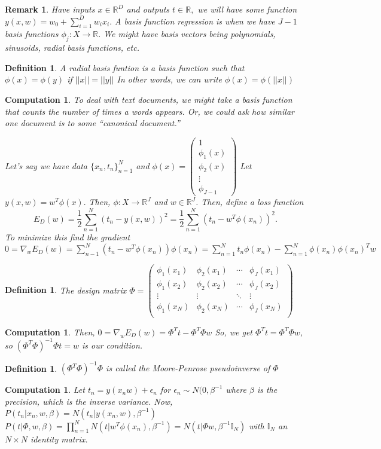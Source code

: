 \documentclass{amsart}
\newtheorem{comp}[subsubsection]{Computation}
\newtheorem{defn}[subsubsection]{Definition}
\newtheorem{rem}[subsubsection]{Remark}
\begin{document}
\begin{rem}Have inputs $x \in \mathbb R^D$ and outputs $t \in \mathbb R,$ we will have some function $y(x,w)= w_0 + \sum_{i=1}^D w_i x_i.$ A basis function regression is when we have $J-1$ basis functions $\phi_j:X\rightarrow \mathbb R.$ We might have basis vectors being polynomials, sinusoids, radial basis functions, etc.
\end{rem}
\begin{defn}
A radial basis funtion is a basis function such that $\phi(x)=\phi(y)$ if $||x||=||y||$ In other words, we can write $\phi(x)=\phi(||x||)$ 
\end{defn}
\begin{comp}
To deal with text documents, we might take a basis function that counts the number of times a words appears. Or, we could ask how similar one document is to some ``canonical document.''

Let's say we have data $\{x_n, t_n\}_{n=1}^N$ and 
$\phi(x) =\begin{pmatrix}
1 \\
\phi_1(x)\\
\phi_2(x)\\
\vdots\\
\phi_{J-1}
\end{pmatrix}$
Let $y(x,w) = w^T\phi(x).$ Then, $\phi:X\rightarrow \mathbb R^J$ and $w \in \mathbb R^J$. Then, define a loss function $$E_D(w) = \frac 1 2 \sum_{n=1}^N(t_n -y(x,w))^2=\frac 1 2 \sum_{n=1}^N (t_n-w^T\phi(x_n))^2.$$
To minimize this find the gradient
$0=\nabla_w E_D(w) = \sum_{n-1}^N(t_n-w^T\phi(x_n))\phi(x_n) = \sum_{n=1}^N t_n\phi(x_n) - \sum_{n=1}^N \phi(x_n)\phi(x_n)^T w$
\end{comp}
\begin{defn} The design matrix $\Phi =
\begin{pmatrix}
\phi_1(x_1) & \phi_2(x_1) & \cdots & \phi_J(x_1) \\
\phi_1(x_2) & \phi_2(x_2) & \cdots & \phi_J(x_2) \\
\vdots & \vdots & \ddots & \vdots \\
\phi_1(x_N) & \phi_2(x_N) & \cdots & \phi_J(x_N) \\
\end{pmatrix}$
\end{defn}
\begin{comp}
Then,
$0= \nabla_w E_D(w) = \Phi^T t - \Phi^T\Phi w$
So, we get $\Phi^T t = \Phi^T \Phi w$, so $(\Phi^T \Phi)^{-1} \Phi t = w$ is our condition.
\end{comp}
\begin{defn}
$(\Phi^T \Phi)^{-1} \Phi$ is called the Moore-Penrose pseudoinverse of $\Phi$
\end{defn}
\begin{comp}
Let $t_n = y(x_n w) + \epsilon_n$ for $\epsilon_n \sim N(0,\beta^{-1}$ where $\beta$ is the precision, which is the inverse variance. Now,
$P(t_n|x_n,w,\beta) = N(t_n|y(x_n,w),\beta^{-1})$
$P(t|\Phi,w,\beta) = \prod_{n=1}^N N(t|w^T\phi(x_n),\beta^{-1})=N(t|\Phi w,\beta^{-1} \mathbb I_N)$ with $\mathbb I_N$ an $N \times N$ identity matrix.
\end{comp}
\end{document}
